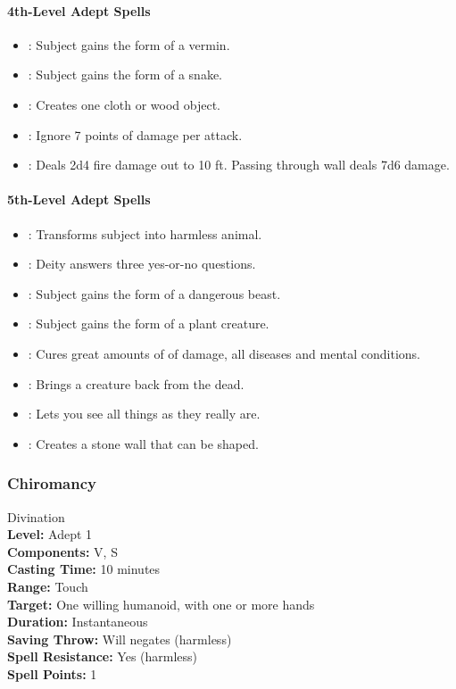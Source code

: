 \paragraph{4th-Level Adept Spells}
\begin{itemize}
 \item {}: Subject gains the form of a vermin.
 \item {}: Subject gains the form of a snake.
 \item {}: Creates one cloth or wood object.
 \item {}: Ignore 7 points of damage per attack.
 \item {}: Deals 2d4 fire damage out to 10 ft. Passing through wall deals 7d6 damage.
\end{itemize}
\paragraph{5th-Level Adept Spells}
\begin{itemize}
 \item {}: Transforms subject into harmless animal.
 \item {}: Deity answers three yes-or-no questions.
 \item {}: Subject gains the form of a dangerous beast.
 \item {}: Subject gains the form of a plant creature.
 \item {}: Cures great amounts of of damage, all diseases and mental conditions.
 \item {}: Brings a creature back from the dead.
 \item {}: Lets you see all things as they really are.
 \item {}: Creates a stone wall that can be shaped.
\end{itemize}

\subsubsection{Chiromancy}
\label{Spell:Chiromancy}
Divination
\\ \textbf{Level:} Adept 1
\\ \textbf{Components:} V, S
\\ \textbf{Casting Time:} 10 minutes
\\ \textbf{Range:} Touch
\\ \textbf{Target:} One willing humanoid, with one or more hands
\\ \textbf{Duration:} Instantaneous
\\ \textbf{Saving Throw:} Will negates (harmless)
\\ \textbf{Spell Resistance:} Yes (harmless)
\\ \textbf{Spell Points:} 1

